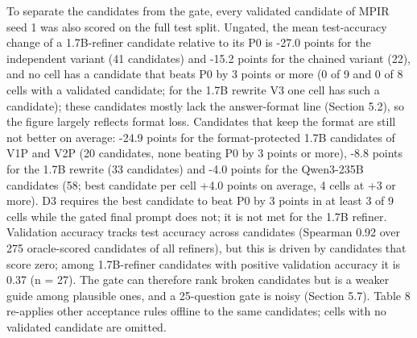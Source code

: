 \documentclass{ieeeaccess}
\begin{document}
To separate the candidates from the gate, every validated candidate of MPIR seed 1 was also scored on the full test split. Ungated, the mean test-accuracy change of a 1.7B-refiner candidate relative to its P0 is -27.0 points for the independent variant (41 candidates) and -15.2 points for the chained variant (22), and no cell has a candidate that beats P0 by 3 points or more (0 of 9 and 0 of 8 cells with a validated candidate; for the 1.7B rewrite V3 one cell has such a candidate); these candidates mostly lack the answer-format line (Section 5.2), so the figure largely reflects format loss. Candidates that keep the format are still not better on average: -24.9 points for the format-protected 1.7B candidates of V1P and V2P (20 candidates, none beating P0 by 3 points or more), -8.8 points for the 1.7B rewrite (33 candidates) and -4.0 points for the Qwen3-235B candidates (58; best candidate per cell +4.0 points on average, 4 cells at +3 or more). D3 requires the best candidate to beat P0 by 3 points in at least 3 of 9 cells while the gated final prompt does not; it is not met for the 1.7B refiner. Validation accuracy tracks test accuracy across candidates (Spearman 0.92 over 275 oracle-scored candidates of all refiners), but this is driven by candidates that score zero; among 1.7B-refiner candidates with positive validation accuracy it is 0.37 (n = 27). The gate can therefore rank broken candidates but is a weaker guide among plausible ones, and a 25-question gate is noisy (Section 5.7). Table 8 re-applies other acceptance rules offline to the same candidates; cells with no validated candidate are omitted.
\end{document}
